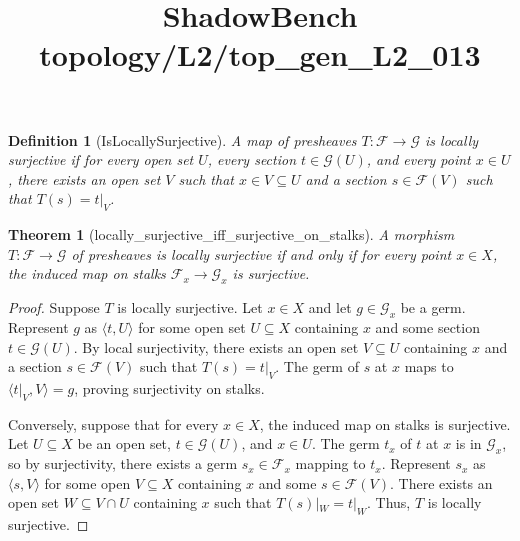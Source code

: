 \documentclass{article}
\title{ShadowBench topology/L2/top\_gen\_L2\_013}
\newtheorem{theorem}{Theorem}
\newtheorem{definition}{Definition}
\begin{document}
\maketitle

\begin{definition}[IsLocallySurjective]
A map of presheaves \( T : \mathcal{F} \to \mathcal{G} \) is \emph{locally surjective} if for every open set \( U \), every section \( t \in \mathcal{G}(U) \), and every point \( x \in U \), there exists an open set \( V \) such that \( x \in V \subseteq U \) and a section \( s \in \mathcal{F}(V) \) such that \( T(s) = t|_V \).
\end{definition}

\begin{theorem}[locally_surjective_iff_surjective_on_stalks]
A morphism \( T : \mathcal{F} \to \mathcal{G} \) of presheaves is locally surjective if and only if for every point \( x \in X \), the induced map on stalks \( \mathcal{F}_x \to \mathcal{G}_x \) is surjective.
\end{theorem}
\begin{proof}
Suppose \( T \) is locally surjective. Let \( x \in X \) and let \( g \in \mathcal{G}_x \) be a germ. Represent \( g \) as \( \langle t, U \rangle \) for some open set \( U \subseteq X \) containing \( x \) and some section \( t \in \mathcal{G}(U) \). By local surjectivity, there exists an open set \( V \subseteq U \) containing \( x \) and a section \( s \in \mathcal{F}(V) \) such that \( T(s) = t|_V \). The germ of \( s \) at \( x \) maps to \( \langle t|_V ,V \rangle = g \), proving surjectivity on stalks.

Conversely, suppose that for every \( x \in X \), the induced map on stalks is surjective. Let \( U \subseteq X \) be an open set, \( t \in \mathcal{G}(U) \), and \( x \in U \). The germ \( t_x \) of \( t \) at \( x \) is in \( \mathcal{G}_x \), so by surjectivity, there exists a germ \( s_x \in \mathcal{F}_x \) mapping to \( t_x \). Represent \( s_x \) as \( \langle s, V \rangle \) for some open \( V \subseteq X \) containing \( x \) and some \( s \in \mathcal{F}(V) \). There exists an open set \( W \subseteq V \cap U \) containing \( x \) such that \( T(s)|_W = t|_W \). Thus, \( T \) is locally surjective.
\end{proof}
\end{document}
